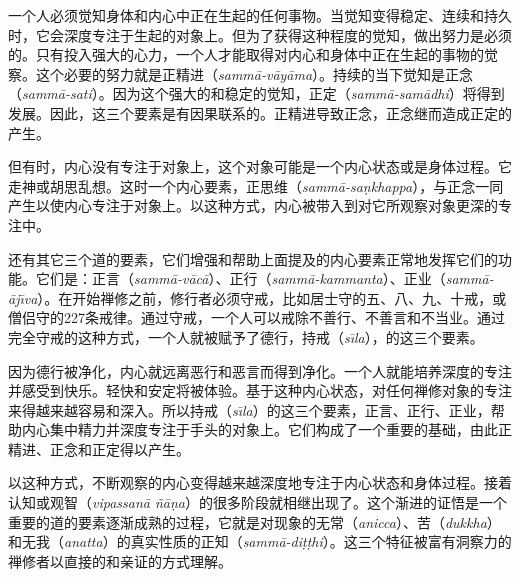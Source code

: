 一个人必须觉知身体和内心中正在生起的任何事物。当觉知变得稳定、连续和持久时，它会深度专注于生起的对象上。但为了获得这种程度的觉知，做出努力是必须的。只有投入强大的心力，一个人才能取得对内心和身体中正在生起的事物的觉察。这个必要的努力就是正精进（{\it samm\=a-v\=ay\=ama}）。持续的当下觉知是正念（{\it samm\=a-sati}）。因为这个强大的和稳定的觉知，正定（{\it samm\=a-sam\=adhi}）将得到发展。因此，这三个要素是有因果联系的。正精进导致正念，正念继而造成正定的产生。

但有时，内心没有专注于对象上，这个对象可能是一个内心状态或是身体过程。它走神或胡思乱想。这时一个内心要素，正思维（{\it samm\=a-sa\d nkhappa}），与正念一同产生以使内心专注于对象上。以这种方式，内心被带入到对它所观察对象更深的专注中。

还有其它三个道的要素，它们增强和帮助上面提及的内心要素正常地发挥它们的功能。它们是：正言（{\it samm\=a-v\=ac\=a}）、正\1行（{\it samm\=a-kammanta}）、正业（{\it samm\=a-\=aj\=\i va}）。在开始禅修之前，修行者必须守戒，比如居士守的五、八、九、十戒，或僧侣守的227条戒律。通过守戒，一个人可以戒除不善行、不善言和不当业。通过完全守戒的这种方式，一个人就被赋予了德行，持戒（{\it s\=\i la}），的这三个要素。

因为德行被净化，内心就远离恶行和恶言而得到净化。一个人就能培养深度的专注并感受到快乐。轻快和安定将被体验。基于这种内心状态，对任何禅修对象的专注来得越来越容易和深入。所以持戒（{\it s\=\i la}）的这三个要素，正言、正行、正业，帮助内心集中精力并深度专注于手头的对象上。它们构成了一个重要的基础，由此正精进、正念和正定得以产生。

以这种方式，不断观察的内心变得越来越深度地专注于内心状态和身体过程。接着认知或观智（{\it vipassan\=a \~n\=a\d na}）的很多阶段就相继出现了。这个渐进的证悟是一个重要的道的要素逐渐成熟的过程，它就是对现象的无常（{\it anicca}）、苦（{\it dukkha}）和无我（{\it anatta}）的真实性质的正知（{\it samm\=a-di\d t\d thi}）。这三个特征被富有洞察力的禅修者以直接的和亲证的方式理解。

\endchapter

\byebye
